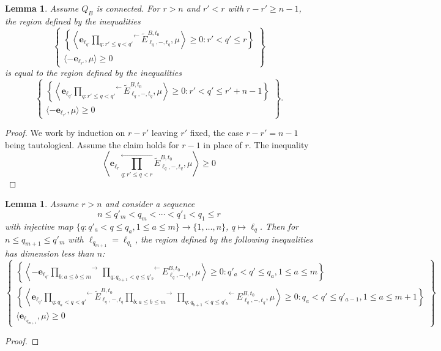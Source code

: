 \documentclass{amsart}
\newtheorem{lemma}[theorem]{Lemma}
\numberwithin{theorem}{section}
\newcommand{\bfe}{\boldsymbol{e}}
\begin{document}
  \begin{lemma}
    Assume $Q_B$ is connected.
    For $r > n$ and $r'<r$ with $r-r'\ge n-1$, the region defined by the inequalities
    \[
      \left\{\substack{
        \left\{\left\langle \bfe_{\ell_{q'}} \stackrel{\leftarrow}{\prod\limits_{q:r' \le q < q'}} \tilde E^{B,t_0}_{\ell_q,-,t_q}, \mu \right\rangle \ge 0:r' < q' \le r \right\}\\
        \langle -\bfe_{\ell_{r'}}, \mu\rangle \ge 0
      }\right\}
    \]
    is equal to the region defined by the inequalities
    \[
      \left\{\substack{
        \left\{\left\langle \bfe_{\ell_{q'}} \stackrel{\leftarrow}{\prod\limits_{q:r' \le q < q'}} \tilde E^{B,t_0}_{\ell_q,-,t_q}, \mu \right\rangle \ge 0:r' < q' \le r'+n-1 \right\}\\
        \langle -\bfe_{\ell_{r'}}, \mu\rangle \ge 0
      }\right\}.
    \]
  \end{lemma}
  \begin{proof}
    We work by induction on $r-r'$ leaving $r'$ fixed, the case $r-r'=n-1$ being tautological.
    Assume the claim holds for $r-1$ in place of $r$.
    The inequality 
    \[
      \left\langle \bfe_{\ell_r} \stackrel{\leftarrow}{\prod\limits_{q:r' \le q < r}} \tilde E^{B,t_0}_{\ell_q,-,t_q}, \mu \right\rangle \ge 0
    \]

  \end{proof}

  \begin{lemma}
    Assume $r > n$ and consider a sequence 
    \[n\le q'_m < q_m < \cdots < q'_1 < q_1\le r\] 
    with injective map $\{q:q'_a < q \le q_a, 1\le a\le m\}\to\{1,\ldots,n\}$, $q\mapsto\ell_q$.
    Then for $n\le q_{m+1}\le q'_m$ with $\ell_{q_{m+1}}=\ell_{q_1}$, the region defined by the following inequalities has dimension less than $n$:
    \[
      \left\{\substack{
        \left\{\left\langle -\bfe_{\ell_{q'}} \stackrel{\rightarrow}{\prod\limits_{b:a\le b\le m}}\, \stackrel{\leftarrow}{\prod\limits_{q:q_{b+1} < q \le q'_b}} E^{B,t_0}_{\ell_q,-,t_q} ,\mu \right\rangle \ge 0:q'_a < q'\le q_a,1\le a\le m\right\}\\
        \left\{\left\langle \bfe_{\ell_{q'}} \stackrel{\leftarrow}{\prod\limits_{q:q_a < q < q'}} \tilde E^{B,t_0}_{\ell_q,-,t_q} \stackrel{\rightarrow}{\prod\limits_{b:a\le b\le m}}\, \stackrel{\leftarrow}{\prod\limits_{q:q_{b+1} < q \le q'_b}} E^{B,t_0}_{\ell_q,-,t_q} ,\mu \right\rangle \ge 0:q_a < q' \le q'_{a-1},1\le a\le m+1\right\}\\
        \langle \bfe_{\ell_{q_{m+1}}}, \mu\rangle \ge 0
      }\right\}
    \]
  \end{lemma}
  \begin{proof}
  \end{proof}
\end{document}
